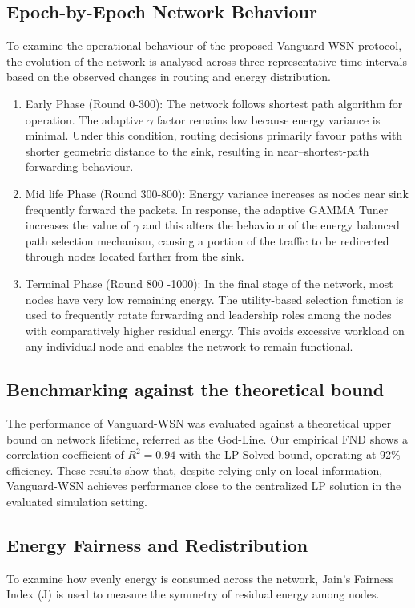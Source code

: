 \documentclass[conference]{IEEEtran}
\begin{document}
\subsection{Epoch-by-Epoch Network Behaviour}
To examine the operational behaviour of the proposed Vanguard-WSN protocol, the evolution of the network is analysed across three representative time intervals based on the observed changes in routing and energy distribution.
\begin{enumerate}
    \item Early Phase (Round 0-300): The network follows shortest path algorithm for operation. The adaptive $\gamma$ factor remains low because energy variance is minimal. Under this condition, routing decisions primarily favour paths with shorter geometric distance to the sink, resulting in near–shortest-path forwarding behaviour.
    \item Mid life Phase (Round 300-800): Energy variance increases as nodes near sink frequently forward the packets. In response, the adaptive GAMMA Tuner increases the value of $\gamma$ and this alters the behaviour of the energy balanced path selection mechanism, causing a portion of the traffic to be redirected through nodes located farther from the sink.
    \item Terminal Phase (Round 800 -1000): In the final stage of the network, most nodes have very low remaining energy. The utility-based selection function is used to frequently rotate forwarding and leadership roles among the nodes with comparatively higher residual energy. This avoids excessive workload on any individual node and enables the network to remain functional.
\end{enumerate}

\subsection{Benchmarking against the theoretical bound}
The performance of Vanguard-WSN was evaluated against a theoretical upper bound on network lifetime, referred as the God-Line. Our empirical FND shows a correlation coefficient of $R^2 = 0.94$ with the LP-Solved bound, operating at 92\% efficiency. These results show that, despite relying only on local information, Vanguard-WSN achieves performance close to the centralized LP solution in the evaluated simulation setting.

\subsection{Energy Fairness and Redistribution}
To examine how evenly energy is consumed across the network, Jain’s Fairness Index (J) is used to measure the symmetry of residual energy among nodes.
\end{document}

